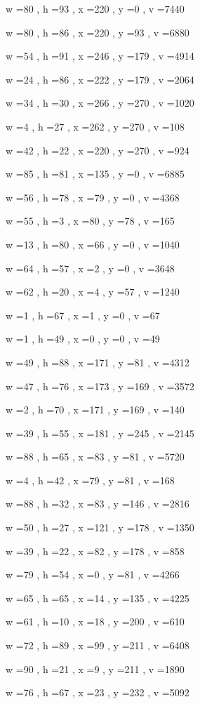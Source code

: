 \documentclass[11pt]{article}
\begin{document}
w =80 , h =93 , x =220 , y =0 , v =7440
\par
w =80 , h =86 , x =220 , y =93 , v =6880
\par
w =54 , h =91 , x =246 , y =179 , v =4914
\par
w =24 , h =86 , x =222 , y =179 , v =2064
\par
w =34 , h =30 , x =266 , y =270 , v =1020
\par
w =4 , h =27 , x =262 , y =270 , v =108
\par
w =42 , h =22 , x =220 , y =270 , v =924
\par
w =85 , h =81 , x =135 , y =0 , v =6885
\par
w =56 , h =78 , x =79 , y =0 , v =4368
\par
w =55 , h =3 , x =80 , y =78 , v =165
\par
w =13 , h =80 , x =66 , y =0 , v =1040
\par
w =64 , h =57 , x =2 , y =0 , v =3648
\par
w =62 , h =20 , x =4 , y =57 , v =1240
\par
w =1 , h =67 , x =1 , y =0 , v =67
\par
w =1 , h =49 , x =0 , y =0 , v =49
\par
w =49 , h =88 , x =171 , y =81 , v =4312
\par
w =47 , h =76 , x =173 , y =169 , v =3572
\par
w =2 , h =70 , x =171 , y =169 , v =140
\par
w =39 , h =55 , x =181 , y =245 , v =2145
\par
w =88 , h =65 , x =83 , y =81 , v =5720
\par
w =4 , h =42 , x =79 , y =81 , v =168
\par
w =88 , h =32 , x =83 , y =146 , v =2816
\par
w =50 , h =27 , x =121 , y =178 , v =1350
\par
w =39 , h =22 , x =82 , y =178 , v =858
\par
w =79 , h =54 , x =0 , y =81 , v =4266
\par
w =65 , h =65 , x =14 , y =135 , v =4225
\par
w =61 , h =10 , x =18 , y =200 , v =610
\par
w =72 , h =89 , x =99 , y =211 , v =6408
\par
w =90 , h =21 , x =9 , y =211 , v =1890
\par
w =76 , h =67 , x =23 , y =232 , v =5092
\par
\newpage
\end{document}
